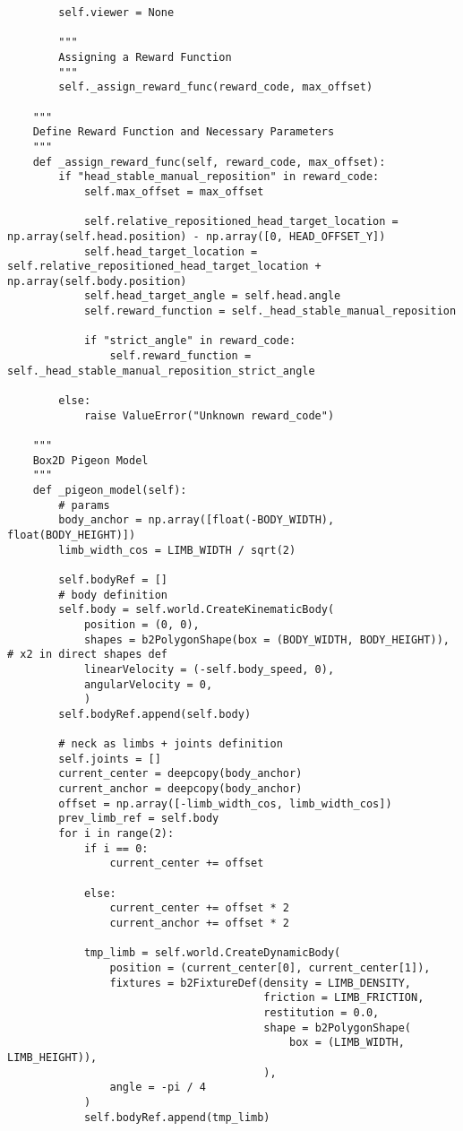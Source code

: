 \begin{itemize}
\begin{lstlisting}
        self.viewer = None

        """
        Assigning a Reward Function
        """
        self._assign_reward_func(reward_code, max_offset)

    """
    Define Reward Function and Necessary Parameters
    """
    def _assign_reward_func(self, reward_code, max_offset):
        if "head_stable_manual_reposition" in reward_code:
            self.max_offset = max_offset

            self.relative_repositioned_head_target_location = np.array(self.head.position) - np.array([0, HEAD_OFFSET_Y])
            self.head_target_location = self.relative_repositioned_head_target_location + np.array(self.body.position)
            self.head_target_angle = self.head.angle
            self.reward_function = self._head_stable_manual_reposition

            if "strict_angle" in reward_code:
                self.reward_function = self._head_stable_manual_reposition_strict_angle

        else:
            raise ValueError("Unknown reward_code")

    """
    Box2D Pigeon Model
    """
    def _pigeon_model(self):
        # params
        body_anchor = np.array([float(-BODY_WIDTH), float(BODY_HEIGHT)])
        limb_width_cos = LIMB_WIDTH / sqrt(2)

        self.bodyRef = []
        # body definition
        self.body = self.world.CreateKinematicBody(
            position = (0, 0),
            shapes = b2PolygonShape(box = (BODY_WIDTH, BODY_HEIGHT)), # x2 in direct shapes def
            linearVelocity = (-self.body_speed, 0),
            angularVelocity = 0,
            )
        self.bodyRef.append(self.body)

        # neck as limbs + joints definition
        self.joints = []
        current_center = deepcopy(body_anchor)
        current_anchor = deepcopy(body_anchor)
        offset = np.array([-limb_width_cos, limb_width_cos])
        prev_limb_ref = self.body
        for i in range(2):
            if i == 0:
                current_center += offset

            else:
                current_center += offset * 2
                current_anchor += offset * 2

            tmp_limb = self.world.CreateDynamicBody(
                position = (current_center[0], current_center[1]),
                fixtures = b2FixtureDef(density = LIMB_DENSITY,
                                        friction = LIMB_FRICTION,
                                        restitution = 0.0,
                                        shape = b2PolygonShape(
                                            box = (LIMB_WIDTH, LIMB_HEIGHT)),
                                        ),
                angle = -pi / 4
            )
            self.bodyRef.append(tmp_limb)


\end{lstlisting}
\end{itemize}

